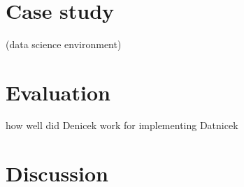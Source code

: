 \documentclass[sigconf,anonymous,screen]{acmart}
\begin{document}
~






\section{Case study}
\label{sec:case}
(data science environment)

\section{Evaluation}
\label{sec:eval}
how well did Denicek work for implementing Datnicek

\section{Discussion}

\end{document}
